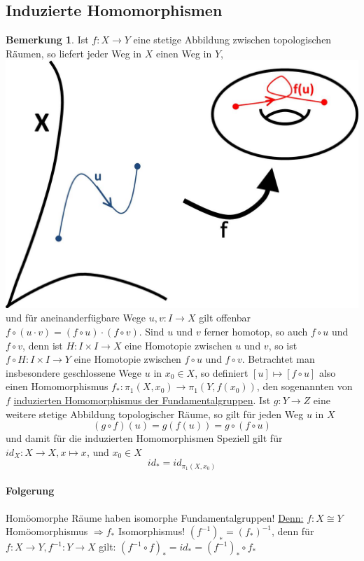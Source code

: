 \documentclass[a4paper,11pt,notitlepage]{report}
\theoremstyle{definition}
\newtheorem{remark}{Bemerkung}[chapter]
\begin{document}
\subsection{Induzierte Homomorphismen}
\begin{remark}
	Ist $f \colon X \rightarrow Y$ eine stetige Abbildung zwischen topologischen Räumen, so liefert jeder Weg in $X$ einen Weg in $Y$, \includegraphics[scale=0.4]{images/Weg_stetige_Abbildung.jpg} und für aneinanderfügbare Wege $u,v \colon I \rightarrow X$ gilt offenbar $f \circ (u \cdot v) = (f \circ u) \cdot (f \circ v)$.
	\newline
	Sind $u$ und $v$ ferner homotop, so auch $f \circ u$ und $f \circ v$, denn ist $H \colon I \times I \rightarrow X$ eine Homotopie zwischen $u$ und $v$, so ist $f \circ H \colon I \times I \rightarrow Y$ eine Homotopie zwischen $f \circ u$ und $f \circ v$.
	\newline
	Betrachtet man insbesondere geschlossene Wege $u$ in $x_0 \in X$, so definiert $[u] \mapsto [f \circ u]$ also einen Homomorphismus $f_* \colon \pi_1(X,x_0) \rightarrow \pi_1(Y, f(x_0))$, den sogenannten von $f$ \underline{induzierten Homomorphismus der Fundamentalgruppen}.
	\newline
	Ist $g \colon Y \rightarrow Z$ eine weitere stetige Abbildung topologischer Räume, so gilt für jeden Weg $u$ in $X$
	$$(g \circ f) (u) = g(f(u)) = g \circ (f \circ u)$$
	und damit für die induzierten Homomorphismen 
	 \newline
	Speziell gilt für $id_X \colon X \rightarrow X, x \mapsto x$, und $x_0 \in X$
	$$id_* = id_{\pi_1(X,x_0)}$$
	
	\paragraph{Folgerung} Homöomorphe Räume haben isomorphe Fundamentalgruppen!
	\underline{Denn:} $f \colon X \cong Y$ Homöomorphismus $\Rightarrow f_*$ Isomorphismus!
	\newline
	$(f^{-1})_*=(f_*)^{-1}$, denn für
	$f \colon X \rightarrow Y, f^{-1} \colon Y \rightarrow X$ gilt:\newline
	$(f^{-1} \circ f)_* = id_* = (f^{-1})_* \circ f_*$
\end{remark}
\end{document}
